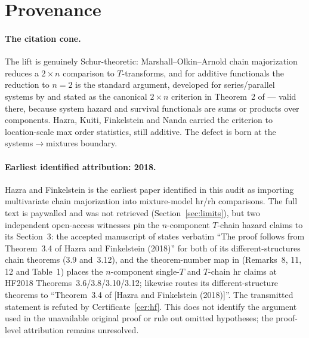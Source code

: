 \documentclass[10pt]{article}
\theoremstyle{plain}
\theoremstyle{definition}
\theoremstyle{remark}
\begin{document}
\section{Provenance}\label{sec:provenance}

\paragraph{The citation cone.} The lift is genuinely Schur-theoretic: Marshall--Olkin--Arnold chain majorization reduces a $2\times n$ comparison to $T$-transforms, and for additive functionals the reduction to $n=2$ is the standard argument, developed for series/parallel systems by \cite{DykstraKocharRojo1997,KhalediKochar2000} and stated as the canonical $2\times n$ criterion in Theorem~2 of \cite{BalakrishnanHaidariMasoumifard2015} --- valid there, because system hazard and survival functionals are sums or products over components. Hazra, Kuiti, Finkelstein and Nanda \cite{HazraKuitiFinkelsteinNanda2017} carried the criterion to location-scale max order statistics, still additive. The defect is born at the systems$\to$mixtures boundary.

\paragraph{Earliest identified attribution: 2018.} Hazra and Finkelstein \cite{HazraFinkelstein2018} is the earliest paper identified in this audit as importing multivariate chain majorization into mixture-model hr/rh comparisons. The full text is paywalled and was not retrieved (Section~\ref{sec:limits}), but two independent open-access witnesses pin the $n$-component $T$-chain hazard claims to its Section~3: the accepted manuscript of \cite{SahooKayalFinkelstein2026} states verbatim ``The proof follows from Theorem~3.4 of Hazra and Finkelstein (2018)'' for both of its different-structures chain theorems (3.9 and~3.12), and the theorem-number map in \cite{ShekariEtAl2026} (Remarks~8, 11, 12 and Table~1) places the $n$-component single-$T$ and $T$-chain hr claims at HF2018 Theorems~3.6/3.8/3.10/3.12; \cite{SahooKayalBalakrishnan2026} likewise routes its different-structure theorems to ``Theorem~3.4 of [Hazra and Finkelstein (2018)]''. The transmitted statement is refuted by Certificate~\ref{cer:hf}. This does not identify the argument used in the unavailable original proof or rule out omitted hypotheses; the proof-level attribution remains unresolved.
\end{document}
